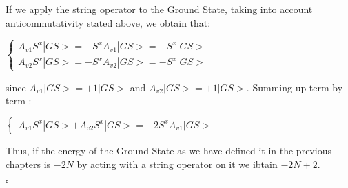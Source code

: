 \documentclass[12pt]{report}
\begin{document}
\begin{minipage}{1 \textwidth}
		If we apply the string operator to the Ground State, taking into account anticommutativity stated above, we obtain that:
		
		\begin{center}
			$\begin{cases}
				A_{v1} S^x |GS> = - S^x A_{v1} |GS> = - S^x |GS> \\
				
				A_{v2} S^x |GS> = - S^x A_{v2} |GS> = - S^x |GS> 
			\end{cases}$ 
	    \end{center}
		
		since $A_{v1}|GS> = +1|GS>$ and $A_{v2}|GS> = +1|GS>$.
		Summing up term by term :\newline
		
		\begin{center}
			$\begin{cases}
				A_{v1} S^x |GS> + A_{v2} S^x |GS> = - 2 S^x A_{v1} |GS> 
			\end{cases}$ 
		\end{center}
		
		Thus, if the energy of the Ground State as we have defined it in the previous chapters is $-2N$ by acting with a string operator on  it we ibtain $-2N+2$.
		
		\hfill $\square$ \newline
		
		
	\end{minipage}
	
\end{document}
